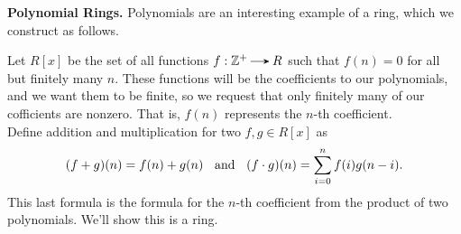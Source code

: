     \textcolor{Red!70!Blue}{
    \textbf{Polynomial Rings.}
    Polynomials are an interesting example of a ring, which we
    construct as follows.}
    
    \indent Let $R[x]$ be the set of all functions
    $f: \ZZ^+ \to R$ such that $f(n) = 0$ for all but finitely
    many $n$. These functions will be the coefficients to our
    polynomials, and we want them to be finite, so we request that
    only finitely many of our cofficients are nonzero.
    That is, $f(n)$ represents the $n$-th coefficient.
    \\

    \noindent Define addition and multiplication for two $f, g \in R[x]$ as 
    \[
        (f + g)(n) = f(n) + g(n) \hspace{0.2cm}\text{ and }\hspace{0.2cm}  (f \cdot g)(n) =
        \sum_{i = 0}^{n}f(i)g(n - i).
    \] 
    This last formula is the formula for the
    $n$-th coefficient from the product of two polynomials. We'll
    show this is a ring.

